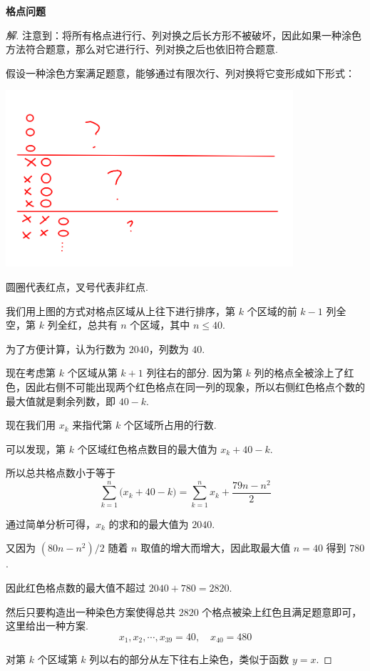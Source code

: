 \textbf{格点问题}
\begin{proof}[解]
    注意到：将所有格点进行行、列对换之后长方形不被破坏，因此如果一种涂色方法符合题意，那么对它进行行、列对换之后也依旧符合题意.

    假设一种涂色方案满足题意，能够通过有限次行、列对换将它变形成如下形式：

    \includegraphics[width=0.8\textwidth]{pictures/6-30.3.png}

    圆圈代表红点，叉号代表非红点.

    我们用上图的方式对格点区域从上往下进行排序，第 $k$ 个区域的前 $k-1$ 列全空，第 $k$ 列全红，总共有 $n$ 个区域，其中 $n \leqslant 40$.

    为了方便计算，认为行数为 $2040$，列数为 $40$.

    现在考虑第 $k$ 个区域从第 $k+1$ 列往右的部分. 因为第 $k$ 列的格点全被涂上了红色，因此右侧不可能出现两个红色格点在同一列的现象，所以右侧红色格点个数的最大值就是剩余列数，即 $40-k$.

    现在我们用 $x_k$ 来指代第 $k$ 个区域所占用的行数.

    可以发现，第 $k$ 个区域红色格点数目的最大值为 $x_k + 40 - k$.

    所以总共格点数小于等于
    \[\sum_{k=1}^{n} \bigl(x_k + 40 - k\bigr) = \sum_{k=1}^{n} x_k + \frac{79n-n^2}{2}\]

    通过简单分析可得，$x_k$ 的求和的最大值为 $2040$.

    又因为 $(80n-n^2)/2$ 随着 $n$ 取值的增大而增大，因此取最大值 $n = 40$ 得到 $780$.

    因此红色格点数的最大值不超过 $2040 + 780 = 2820$.

    然后只要构造出一种染色方案使得总共 $2820$ 个格点被染上红色且满足题意即可，这里给出一种方案.
    \[x_1, x_2, \cdots, x_{39} = 40, \quad x_{40} = 480\]
    
    对第 $k$ 个区域第 $k$ 列以右的部分从左下往右上染色，类似于函数 $y = x$.
\end{proof}